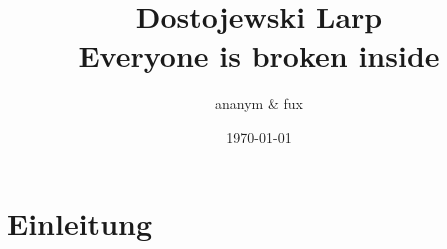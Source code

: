 \documentclass[12pt, a4paper, openany]{report}
\title{
  {\large{Dostojewski Larp}}\\
    {Everyone is broken inside}\\
    {\bigskip}
}
\author{ananym \& fux}
\date{\today}
\begin{document}
\maketitle 
\tableofcontents
\chapter{Einleitung}

 
\end{document}
